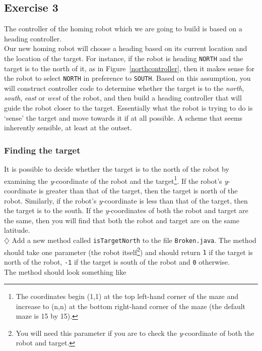 \subsection{Exercise 3}

\noindent
The controller of the homing robot which we are going to 
build is based on a heading controller. \\

\noindent
Our new homing robot will choose a heading based on its current location 
and the location of the target. For instance,
if the robot is heading {\tt NORTH} and the target is to the north of it, as
in Figure~\ref{northcontroller}, then
it makes sense for the robot to select {\tt NORTH} in preference to 
{\tt SOUTH}. 
Based on this assumption, you will construct controller code to determine
whether
the target is to the {\em north}, {\em south}, {\em east} or {\em west} of 
the robot, and then 
build a heading controller that will guide 
the robot closer to the target.
Essentially what the robot is trying to do is `sense' the target and move 
towards it if at all possible. A scheme that seems inherently sensible, at 
least at the outset.

\subsubsection{Finding the target}

\noindent
It is possible to decide whether the target is to the north of the robot by 
examining the {\em y}-coordinate of the robot and the target\footnote{The 
coordinates begin (1,1) at the top left-hand corner of the maze and increase
to (n,n) at the bottom right-hand corner of the maze (the default maze is 15 by
15).}. If the robot's {\em y}-coordinate is greater than that of the target, 
then the target is north of the robot. Similarly, if the robot's 
{\em y}-coordinate is less than that of the target, then the target is to the 
south. If the {\em y}-coordinates of both the robot and target are the same, 
then you will find that both the robot and target are on the same latitude.\\

\noindent
$\diamondsuit$ Add a new method called {\tt isTargetNorth} to the file 
{\tt Broken.java}. The method should take one parameter (the robot 
itself\footnote{You will need this parameter if you are to check the 
{\em y}-coordinate of both the robot and target.}) and should return 
{\tt 1} if the target is north of the robot, {\tt -1} if the target 
is south of the robot and {\tt 0} otherwise.\\
\clearpage
\noindent
The method should look something like


